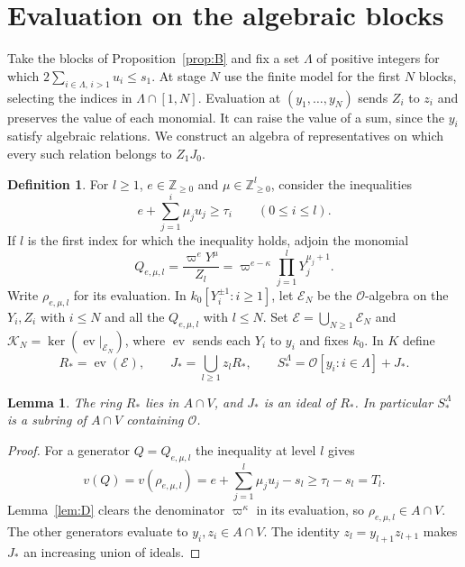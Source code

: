\documentclass[11pt, letterpaper]{article}
\newtheorem{lemma}[theorem]{Lemma}
\theoremstyle{definition}
\newtheorem{definition}[theorem]{Definition}
\theoremstyle{remark}
\begin{document}
\section{Evaluation on the algebraic blocks}
\label{sec:transfer}

Take the blocks of Proposition~\ref{prop:B} and fix a set $\Lambda$ of positive integers for which $2\sum_{i \in \Lambda,\, i > 1} u_{i} \le s_{1}$.
At stage $N$ use the finite model for the first $N$ blocks, selecting the indices in $\Lambda \cap [1, N]$.
Evaluation at $(y_{1}, \dots, y_{N})$ sends $Z_{i}$ to $z_{i}$ and preserves the value of each monomial.
It can raise the value of a sum, since the $y_{i}$ satisfy algebraic relations.
We construct an algebra of representatives on which every such relation belongs to $Z_{1}J_{0}$.

\begin{definition}
    \label{def:R}
    For $l \ge 1$, $e \in \mathbb{Z}_{\ge 0}$ and $\mu \in \mathbb{Z}_{\ge 0}^{l}$, consider the inequalities
    \[
        e + \sum_{j = 1}^{i} \mu_{j}u_{j} \ge \tau_{i}
        \qquad (0 \le i \le l).
    \]
    If $l$ is the first index for which the inequality holds, adjoin the monomial
    \[
        Q_{e, \mu, l} = \frac{\varpi^{e}Y^{\mu}}{Z_{l}}
        = \varpi^{e - \kappa}\prod_{j = 1}^{l}Y_{j}^{\mu_{j} + 1}.
    \]
    Write $\rho_{e, \mu, l}$ for its evaluation.
    In $k_{0}[Y_{i}^{\pm 1} : i \ge 1]$, let $\mathcal{E}_{N}$ be the $\mathcal{O}$-algebra on the $Y_{i}, Z_{i}$ with $i \le N$ and all the $Q_{e, \mu, l}$ with $l \le N$.
    Set $\mathcal{E} = \bigcup_{N \ge 1}\mathcal{E}_{N}$ and $\mathcal{K}_{N} = \ker(\operatorname{ev}|_{\mathcal{E}_{N}})$, where $\operatorname{ev}$ sends each $Y_{i}$ to $y_{i}$ and fixes $k_{0}$.
    In $K$ define
    \[
        R_{*} = \operatorname{ev}(\mathcal{E}), \qquad
        J_{*} = \bigcup_{l \ge 1} z_{l}R_{*}, \qquad
        S_{*}^{\Lambda} = \mathcal{O}[y_{i} : i \in \Lambda] + J_{*}.
    \]
\end{definition}

\begin{lemma}
    \label{lem:Rclaim}
    The ring $R_{*}$ lies in $A \cap V$, and $J_{*}$ is an ideal of $R_{*}$.
    In particular $S_{*}^{\Lambda}$ is a subring of $A \cap V$ containing $\mathcal{O}$.
\end{lemma}

\begin{proof}
    For a generator $Q = Q_{e, \mu, l}$ the inequality at level $l$ gives
    \[
        v(Q) = v(\rho_{e, \mu, l}) = e + \sum_{j = 1}^{l}\mu_{j}u_{j} - s_{l}
        \ge \tau_{l} - s_{l} = T_{l}.
    \]
    Lemma~\ref{lem:D} clears the denominator $\varpi^{\kappa}$ in its evaluation, so $\rho_{e, \mu, l} \in A \cap V$.
    The other generators evaluate to $y_{i}, z_{i} \in A \cap V$.
    The identity $z_{l} = y_{l + 1}z_{l + 1}$ makes $J_{*}$ an increasing union of ideals.
\end{proof}
\end{document}
